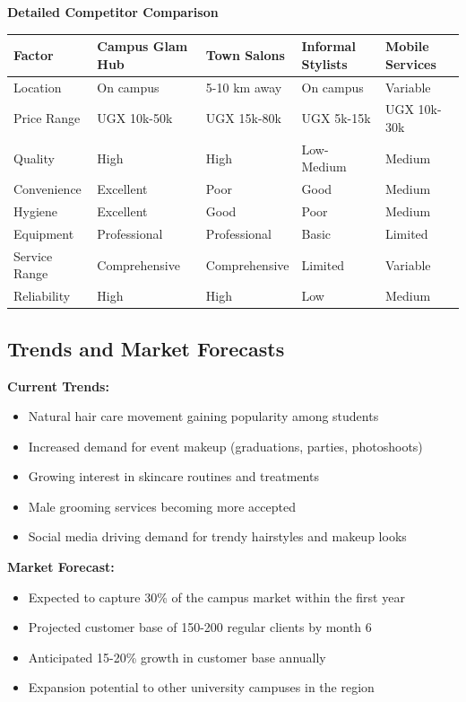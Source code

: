 \begin{center}
\textbf{Detailed Competitor Comparison}
\vspace{0.5em}

\begin{tabular}{|>{\raggedright\arraybackslash}p{2.5cm}|p{2.2cm}|p{2.2cm}|p{2.2cm}|p{2.2cm}|}
\hline
\rowcolor{primarycolor!20}
\textbf{Factor} & \textbf{Campus Glam Hub} & \textbf{Town Salons} & \textbf{Informal Stylists} & \textbf{Mobile Services} \\
\hline
Location & On campus & 5-10 km away & On campus & Variable \\
\hline
Price Range & UGX 10k-50k & UGX 15k-80k & UGX 5k-15k & UGX 10k-30k \\
\hline
Quality & High & High & Low-Medium & Medium \\
\hline
Convenience & Excellent & Poor & Good & Medium \\
\hline
Hygiene & Excellent & Good & Poor & Medium \\
\hline
Equipment & Professional & Professional & Basic & Limited \\
\hline
Service Range & Comprehensive & Comprehensive & Limited & Variable \\
\hline
Reliability & High & High & Low & Medium \\
\hline
\end{tabular}
\end{center}

\subsection{Trends and Market Forecasts}

\textbf{Current Trends:}
\begin{itemize}[leftmargin=2em]
    \item Natural hair care movement gaining popularity among students
    \item Increased demand for event makeup (graduations, parties, photoshoots)
    \item Growing interest in skincare routines and treatments
    \item Male grooming services becoming more accepted
    \item Social media driving demand for trendy hairstyles and makeup looks
\end{itemize}

\textbf{Market Forecast:}
\begin{itemize}[leftmargin=2em]
    \item Expected to capture 30\% of the campus market within the first year
    \item Projected customer base of 150-200 regular clients by month 6
    \item Anticipated 15-20\% growth in customer base annually
    \item Expansion potential to other university campuses in the region
\end{itemize}


